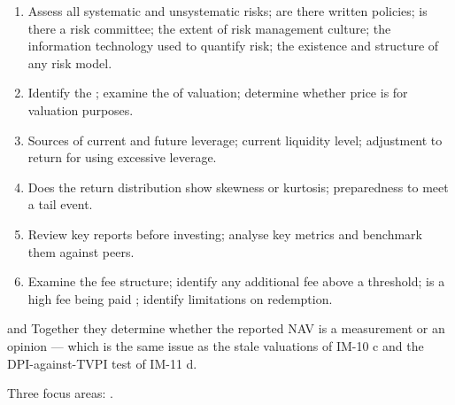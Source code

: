 \begin{enumerate}[label=\alph*)]
\item {} Assess all systematic and unsystematic risks; are there written
policies; is there a risk committee; the extent of risk management culture; the
information technology used to quantify risk; the existence and structure of any
risk model.
\item {} Identify the ; examine the  of valuation;
determine whether price is  for valuation purposes.
\item {} Sources of current and future
leverage; current liquidity level; adjustment to return for using excessive
leverage.
\item {} Does the return distribution show skewness or
kurtosis; preparedness to meet a tail event.
\item {} Review key reports before investing; analyse key
metrics and benchmark them against peers.
\item {} Examine the
fee structure; identify any additional fee above a threshold; is a high fee being
paid ; identify limitations on redemption.
\end{enumerate}

\begin{imkeybox}[title={The two questions that do the most work}]
 and
 Together they determine whether the reported
NAV is a measurement or an opinion --- which is the same issue as the stale
valuations of IM-10 c and the DPI-against-TVPI test of IM-11 d.
\end{imkeybox}


Three focus areas: .

